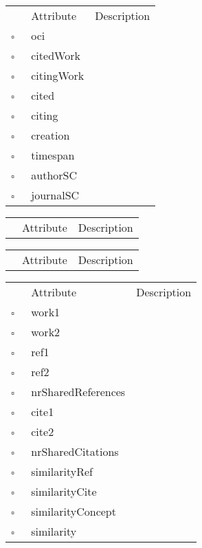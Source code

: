 \begin{table}
\caption{Reference  }

\begin{longtable}{llp{8cm}}
& Attribute & Description \\
$\square$\ & oci &  \\
$\square$\ & citedWork &  \\
$\square$\ & citingWork &  \\
$\square$\ & cited &  \\
$\square$\ & citing &  \\
$\square$\ & creation &  \\
$\square$\ & timespan &  \\
$\square$\ & authorSC &  \\
$\square$\ & journalSC &  \\
\end{longtable}
\label{attr:Reference}
\end{table}

\begin{table}
\caption{Scenario  This class describes the dataset for the application. Typically there is a single instance of this class in the application at all times.}

\begin{longtable}{llp{8cm}}
& Attribute & Description \\
\end{longtable}
\label{attr:Scenario}
\end{table}

\clearpage
\begin{table}
\caption{School  }

\begin{longtable}{llp{8cm}}
& Attribute & Description \\
\end{longtable}
\label{attr:School}
\end{table}

\begin{table}
\caption{Similarity  }

\begin{longtable}{llp{8cm}}
& Attribute & Description \\
$\square$\ & work1 &  \\
$\square$\ & work2 &  \\
$\square$\ & ref1 &  \\
$\square$\ & ref2 &  \\
$\square$\ & nrSharedReferences &  \\
$\square$\ & cite1 &  \\
$\square$\ & cite2 &  \\
$\square$\ & nrSharedCitations &  \\
$\square$\ & similarityRef &  \\
$\square$\ & similarityCite &  \\
$\square$\ & similarityConcept &  \\
$\square$\ & similarity &  \\
\end{longtable}
\label{attr:Similarity}
\end{table}

